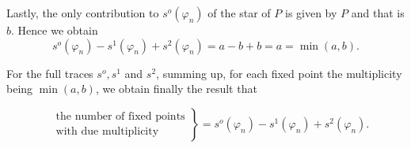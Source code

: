 Lastly, the only contribution to $s^o (\varphi_n)$ of the star of $P$
is given by $P$ and that is $b$. Hence we obtain  
$$
s^o (\varphi_n) - s^1 (\varphi_n) + s^2 (\varphi_n) = a - b + b = a =
\min (a, b). 
$$

For the full traces $s^o, s^1$ and $s^2$, summing up, for each fixed
point the multiplicity being $\min (a, b)$, we obtain finally the
result that  

\begin{equation*}
    \left.
  \begin{aligned}
    &\text{the number of fixed points}\\ 
    &\text{with due multiplicity}
  \end{aligned}\right\}
    = s^o (\varphi_n) - s^1 (\varphi_n) + s^2 (\varphi_n).
\end{equation*}
